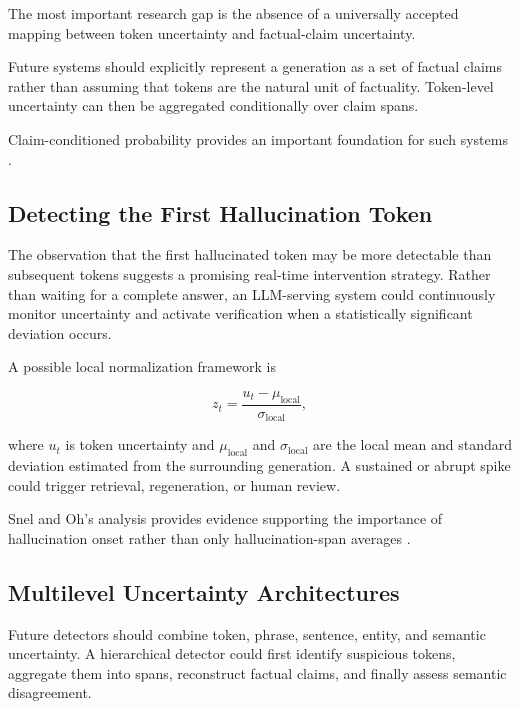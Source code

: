 \documentclass[11pt]{article}
\begin{document}
The most important research gap is the absence of a universally accepted mapping between token uncertainty and factual-claim uncertainty.

Future systems should explicitly represent a generation as a set of factual claims rather than assuming that tokens are the natural unit of factuality. Token-level uncertainty can then be aggregated conditionally over claim spans.

Claim-conditioned probability provides an important foundation for such systems \cite{fadeeva2024}.

\subsection{Detecting the First Hallucination Token}
\label{sec:first-token}

The observation that the first hallucinated token may be more detectable than subsequent tokens suggests a promising real-time intervention strategy. Rather than waiting for a complete answer, an LLM-serving system could continuously monitor uncertainty and activate verification when a statistically significant deviation occurs.

A possible local normalization framework is

\begin{equation}
z_t
=
\frac{u_t-\mu_{\mathrm{local}}}
{\sigma_{\mathrm{local}}},
\label{eq:local-z}
\end{equation}

where $u_t$ is token uncertainty and $\mu_{\mathrm{local}}$ and $\sigma_{\mathrm{local}}$ are the local mean and standard deviation estimated from the surrounding generation. A sustained or abrupt spike could trigger retrieval, regeneration, or human review.

Snel and Oh's analysis provides evidence supporting the importance of hallucination onset rather than only hallucination-span averages \cite{snel2025}.

\subsection{Multilevel Uncertainty Architectures}
\label{sec:multilevel}

Future detectors should combine token, phrase, sentence, entity, and semantic uncertainty. A hierarchical detector could first identify suspicious tokens, aggregate them into spans, reconstruct factual claims, and finally assess semantic disagreement.
\end{document}
